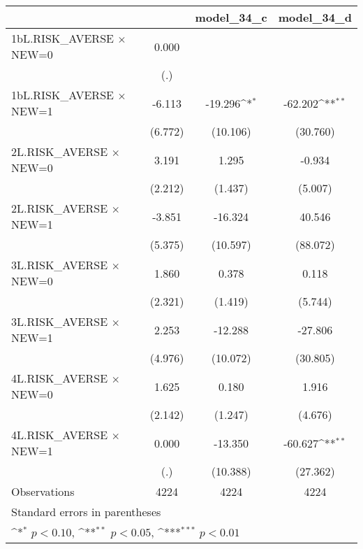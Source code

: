 {
\def\sym#1{\ifmmode^{#1}\else\(^{#1}\)\fi}
\begin{longtable}{l*{3}{c}}
\toprule\endfirsthead\midrule\endhead\midrule\endfoot\endlastfoot
                &\multicolumn{1}{c}{}&\multicolumn{1}{c}{model\_34\_c}&\multicolumn{1}{c}{model\_34\_d}\\
\midrule
1bL.RISK\_AVERSE $\times$ NEW=0&    0.000         &                  &                  \\
                &      (.)         &                  &                  \\
\addlinespace
1bL.RISK\_AVERSE $\times$ NEW=1&   -6.113         &  -19.296\sym{*}  &  -62.202\sym{**} \\
                &  (6.772)         & (10.106)         & (30.760)         \\
\addlinespace
2L.RISK\_AVERSE $\times$ NEW=0&    3.191         &    1.295         &   -0.934         \\
                &  (2.212)         &  (1.437)         &  (5.007)         \\
\addlinespace
2L.RISK\_AVERSE $\times$ NEW=1&   -3.851         &  -16.324         &   40.546         \\
                &  (5.375)         & (10.597)         & (88.072)         \\
\addlinespace
3L.RISK\_AVERSE $\times$ NEW=0&    1.860         &    0.378         &    0.118         \\
                &  (2.321)         &  (1.419)         &  (5.744)         \\
\addlinespace
3L.RISK\_AVERSE $\times$ NEW=1&    2.253         &  -12.288         &  -27.806         \\
                &  (4.976)         & (10.072)         & (30.805)         \\
\addlinespace
4L.RISK\_AVERSE $\times$ NEW=0&    1.625         &    0.180         &    1.916         \\
                &  (2.142)         &  (1.247)         &  (4.676)         \\
\addlinespace
4L.RISK\_AVERSE $\times$ NEW=1&    0.000         &  -13.350         &  -60.627\sym{**} \\
                &      (.)         & (10.388)         & (27.362)         \\
\midrule
Observations    &     4224         &     4224         &     4224         \\
\bottomrule
\multicolumn{4}{l}{\footnotesize Standard errors in parentheses}\\
\multicolumn{4}{l}{\footnotesize \sym{*} \(p<0.10\), \sym{**} \(p<0.05\), \sym{***} \(p<0.01\)}\\
\end{longtable}
}

